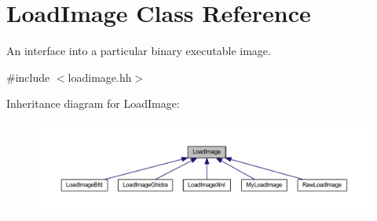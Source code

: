 \hypertarget{class_load_image}{}\section{Load\+Image Class Reference}
\label{class_load_image}


An interface into a particular binary executable image.  




{\ttfamily \#include $<$loadimage.\+hh$>$}



Inheritance diagram for Load\+Image\+:
\nopagebreak
\begin{figure}[H]
\begin{center}
\leavevmode
\includegraphics[width=350pt]{class_load_image__inherit__graph}
\end{center}
\end{figure}
